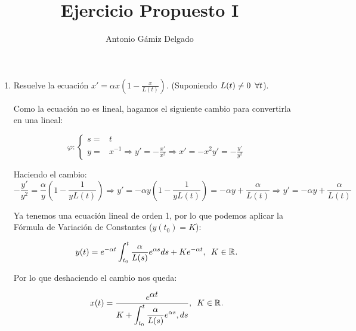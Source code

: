 \documentclass[12pt]{article}
\newcommand{\R}[1][]{\mathbb{R}^{#1}}
\begin{document}

\author{Antonio Gámiz Delgado}
\title{Ejercicio Propuesto I}
\maketitle

\begin{enumerate}
\item Resuelve la ecuación $\displaystyle x'=\alpha x\left(1-\frac{x}{L(t)}\right)$. (Suponiendo $L(t)\neq 0 \enskip \forall t$).

Como la ecuación no es lineal, hagamos el siguiente cambio para convertirla en una lineal:

\[
\varphi : \left \{ 
\begin{array}{ll}
s =& t \\
y =& x^{-1} \Longrightarrow y'=\displaystyle-\frac{x'}{x^2} \Longrightarrow x'=-x^2y'=-\frac{y'}{y^2}
\end{array}
\right.
\]

Haciendo el cambio:
\[
-\frac{y'}{y^2}=\frac{\alpha}{y}\left( 1- \frac{1}{yL(t)} \right) \Longrightarrow y'=-\alpha y\left( 1- \frac{1}{yL(t)} \right)=-\alpha y + \frac{\alpha}{L(t)} \Longrightarrow y'=-\alpha y + \frac{\alpha}{L(t)}
\]

Ya tenemos una ecuación lineal de orden 1, por lo que podemos aplicar la Fórmula de Variación de Constantes ($y(t_0)=K$):

\[
y(t)=e^{-\alpha t}\int_{t_0}^t \frac{\alpha}{L(s)} e^{\alpha s}ds+Ke^{-\alpha t}, \enskip K\in\R.
\]

Por lo que deshaciendo el cambio nos queda:

\[
x(t) = \frac{e^{\displaystyle\alpha t}}{K+\displaystyle\int_{t_0}^t\frac{\alpha}{L(s)} e^{\alpha s}, ds}, \enskip K\in\R.
\]

\end{enumerate}
\end{document}

